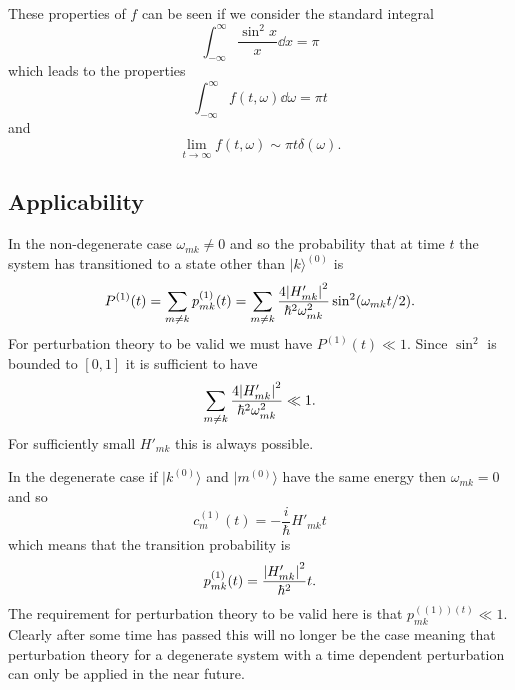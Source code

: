 \documentclass[a4paper]{article}
\renewcommand{\ket}[1]{\vert {#1} \rangle}
\begin{document}
    These properties of \(f\) can be seen if we consider the standard integral
    \[\int_{-\infty}^{\infty} \frac{\sin^2x}{x}\dd{x} = \pi\]
    which leads to the properties
    \[\int_{-\infty}^{\infty} f(t, \omega) \dd{\omega} = \pi t\]
    and
    \[\lim_{t\to\infty} f(t, \omega) \sim \pi t\delta(\omega).\]
    
    \subsection{Applicability}
    In the non-degenerate case \(\omega_{mk}\ne 0\) and so the probability that at time \(t\) the system has transitioned to a state other than \(\ket{k}^{(0)}\) is
    \[P^{(1)}(t) = \sum_{m\ne k}p_{mk}^{(1)}(t) = \sum_{m\ne k}\frac{4\abs{H'_{mk}}^2}{\hbar^2\omega_{mk}^2} \sin^2(\omega_{mk}t/2).\]
    For perturbation theory to be valid we must have \(P^{(1)}(t) \ll 1\).
    Since \(\sin^2\) is bounded to \([0, 1]\) it is sufficient to have
    \[\sum_{m\ne k}\frac{4\abs{H'_{mk}}^2}{\hbar^2\omega_{mk}^2} \ll 1.\]
    For sufficiently small \(H'_{mk}\) this is always possible.
    
    In the degenerate case if \(\ket{k^{(0)}}\) and \(\ket{m^{(0)}}\) have the same energy then \(\omega_{mk} = 0\) and so
    \[c_m^{(1)}(t) = -\frac{i}{\hbar}H'_{mk}t\]
    which means that the transition probability is
    \[p_{mk}^{(1)}(t) = \frac{\abs{H'_{mk}}^2}{\hbar^2}t.\]
    The requirement for perturbation theory to be valid here is that \(p_{mk}^{((1))(t)} \ll 1\).
    Clearly after some time has passed this will no longer be the case meaning that perturbation theory for a degenerate system with a time dependent perturbation can only be applied in the near future.
    
\end{document}
